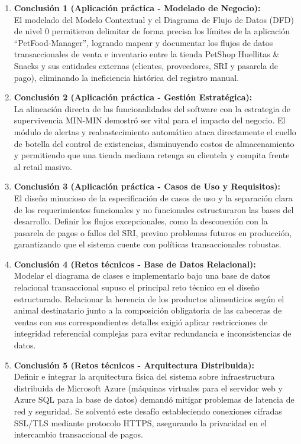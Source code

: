 \documentclass[11pt,a4paper]{article}
\begin{document}
\begin{enumerate}
    \item \textbf{Conclusión 1 (Aplicación práctica - Modelado de Negocio):} \\
    El modelado del Modelo Contextual y el Diagrama de Flujo de Datos (DFD) de nivel 0 permitieron delimitar de forma precisa los límites de la aplicación ``PetFood-Manager'', logrando mapear y documentar los flujos de datos transaccionales de venta e inventario entre la tienda PetShop Huellitas \& Snacks y sus entidades externas (clientes, proveedores, SRI y pasarela de pago), eliminando la ineficiencia histórica del registro manual.
    
    \item \textbf{Conclusión 2 (Aplicación práctica - Gestión Estratégica):} \\
    La alineación directa de las funcionalidades del software con la estrategia de supervivencia MIN-MIN demostró ser vital para el impacto del negocio. El módulo de alertas y reabastecimiento automático ataca directamente el cuello de botella del control de existencias, disminuyendo costos de almacenamiento y permitiendo que una tienda mediana retenga su clientela y compita frente al retail masivo.
    
    \item \textbf{Conclusión 3 (Aplicación práctica - Casos de Uso y Requisitos):} \\
    El diseño minucioso de la especificación de casos de uso y la separación clara de los requerimientos funcionales y no funcionales estructuraron las bases del desarrollo. Definir los flujos excepcionales, como la desconexión con la pasarela de pagos o fallos del SRI, previno problemas futuros en producción, garantizando que el sistema cuente con políticas transaccionales robustas.
    
    \item \textbf{Conclusión 4 (Retos técnicos - Base de Datos Relacional):} \\
    Modelar el diagrama de clases e implementarlo bajo una base de datos relacional transaccional supuso el principal reto técnico en el diseño estructurado. Relacionar la herencia de los productos alimenticios según el animal destinatario junto a la composición obligatoria de las cabeceras de ventas con sus correspondientes detalles exigió aplicar restricciones de integridad referencial complejas para evitar redundancia e inconsistencias de datos.
    
    \item \textbf{Conclusión 5 (Retos técnicos - Arquitectura Distribuida):} \\
    Definir e integrar la arquitectura física del sistema sobre infraestructura distribuida de Microsoft Azure (máquinas virtuales para el servidor web y Azure SQL para la base de datos) demandó mitigar problemas de latencia de red y seguridad. Se solventó este desafío estableciendo conexiones cifradas SSL/TLS mediante protocolo HTTPS, asegurando la privacidad en el intercambio transaccional de pagos.
    

\end{enumerate}
\end{document}
